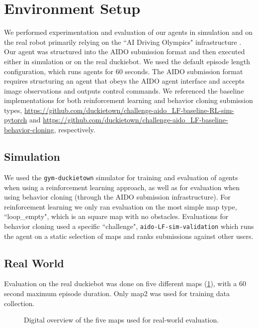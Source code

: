 \documentclass{article}
\begin{document}
\section{Environment Setup}

We performed experimentation and evaluation of our agents in simulation and on the real robot primarily relying on the ``AI Driving Olympics" infrastructure \cite{zilly2019ai}. Our agent was structured into the AIDO submission format and then executed either in simulation or on the real duckiebot. We used the default episode length configuration, which runs agents for 60 seconds. The AIDO submission format requires structuring an agent that obeys the AIDO agent interface and accepts image observations and outputs control commands. We referenced the baseline implementations for both reinforcement learning and behavior cloning submission types, \url{https://github.com/duckietown/challenge-aido_LF-baseline-RL-sim-pytorch} and \url{https://github.com/duckietown/challenge-aido_LF-baseline-behavior-cloning}, respectively.

\subsection{Simulation}

We used the \texttt{gym-duckietown} simulator \cite{gym_duckietown} for training and evaluation of agents when using a reinforcement learning approach, as well as for evaluation when using behavior cloning (through the AIDO submission infrastructure). For reinforcement learning we only ran evaluation on the most simple map type, ``loop\_empty", which is an square map with no obstacles. Evaluations for behavior cloning used a specific ``challenge", \texttt{aido-LF-sim-validation} which runs the agent on a static selection of maps and ranks submissions against other users.

\subsection{Real World}

Evaluation on the real duckiebot was done on five different maps (\ref{fig:maps}), with a 60 second maximum episode duration. Only map2 was used for training data collection.

\begin{figure}[H]
\centering
    \qquad
    \qquad
    \qquad
    \qquad
    \qquad
    \caption{Digital overview of the five maps used for real-world evaluation.}
    \label{fig:maps}
\end{figure}
\end{document}
